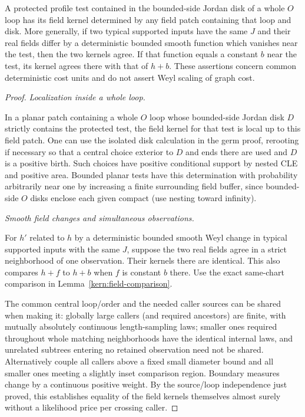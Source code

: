 \begin{lemma}\label{conf:field-kernel-locality}
A protected profile test contained in the bounded-side Jordan disk of a whole \(O\) loop has its
field kernel determined by any field patch containing that loop and disk. More generally, if two
typical supported inputs have the same \(J\) and their real fields differ by a deterministic bounded
smooth function which vanishes near the test, then the two kernels agree. If that function equals a
constant \(b\) near the test, its kernel agrees there with that of \(h+b\). These assertions concern
common deterministic cost units and do not assert Weyl scaling of graph cost.
\end{lemma}
\begin{proof}
\smallskip\noindent\emph{Localization inside a whole loop.}\par

In a planar patch containing a whole \(O\) loop whose bounded-side Jordan disk \(D\) strictly
contains the protected test, the field kernel for that test is local up to this field patch. One can
use the isolated disk calculation in the germ proof, rerooting if necessary so that a central choice
exterior to \(D\) and ends there are used and \(D\) is a positive birth. Such choices have positive
conditional support by nested CLE and positive area. Bounded planar tests have this determination
with probability arbitrarily near one by increasing a finite surrounding field buffer, since
bounded-side \(O\) disks enclose each given compact (use nesting toward infinity).

\smallskip\noindent\emph{Smooth field changes and simultaneous observations.}\par

For \(h'\) related to \(h\) by a deterministic bounded smooth Weyl change in typical supported
inputs with the same \(J\), suppose the two real fields agree in a strict neighborhood of one
observation. Their kernels there are identical. This also compares \(h+f\) to \(h+b\) when \(f\) is
constant \(b\) there. Use the exact same-chart comparison in Lemma~\ref{kern:field-comparison}.

The common central loop/order and the needed caller sources can be shared when making it: globally
large callers (and required ancestors) are finite, with mutually absolutely continuous
length-sampling laws; smaller ones required throughout whole matching neighborhoods have the
identical internal laws, and unrelated subtrees entering no retained observation need not be shared.
Alternatively couple all callers above a fixed small diameter bound and all smaller ones meeting a
slightly inset comparison region. Boundary measures change by a continuous positive weight. By the
source/loop independence just proved, this establishes equality of the field kernels themselves
almost surely without a likelihood price per crossing caller.


\end{proof}
